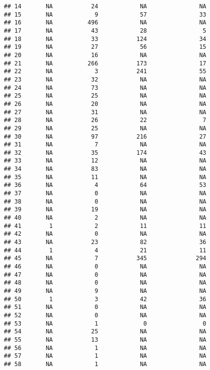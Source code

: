 \documentclass[
  english,
  man]{apa6}
\begin{document}
\begin{verbatim}
## 14       NA           24            NA               NA
## 15       NA            9            57               33
## 16       NA          496            NA               NA
## 17       NA           43            28                5
## 18       NA           33           124               34
## 19       NA           27            56               15
## 20       NA           16            NA               NA
## 21       NA          266           173               17
## 22       NA            3           241               55
## 23       NA           32            NA               NA
## 24       NA           73            NA               NA
## 25       NA           25            NA               NA
## 26       NA           20            NA               NA
## 27       NA           31            NA               NA
## 28       NA           26            22                7
## 29       NA           25            NA               NA
## 30       NA           97           216               27
## 31       NA            7            NA               NA
## 32       NA           35           174               43
## 33       NA           12            NA               NA
## 34       NA           83            NA               NA
## 35       NA           11            NA               NA
## 36       NA            4            64               53
## 37       NA            0            NA               NA
## 38       NA            0            NA               NA
## 39       NA           19            NA               NA
## 40       NA            2            NA               NA
## 41        1            2            11               11
## 42       NA            0            NA               NA
## 43       NA           23            82               36
## 44        1            4            21               11
## 45       NA            7           345              294
## 46       NA            0            NA               NA
## 47       NA            0            NA               NA
## 48       NA            0            NA               NA
## 49       NA            9            NA               NA
## 50        1            3            42               36
## 51       NA            0            NA               NA
## 52       NA            0            NA               NA
## 53       NA            1             0                0
## 54       NA           25            NA               NA
## 55       NA           13            NA               NA
## 56       NA            1            NA               NA
## 57       NA            1            NA               NA
## 58       NA            1            NA               NA

\end{verbatim}
\end{document}
